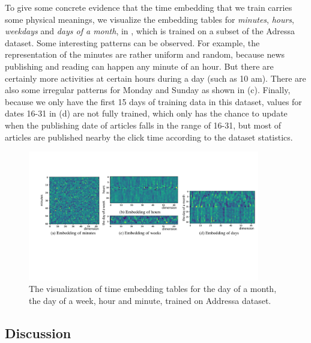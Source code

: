 To give some concrete evidence that the time embedding that we train
carries some physical meanings, we visualize the embedding tables for
\textit{minutes}, \textit{hours}, \textit{weekdays} and \textit{days
of a month}, in , which is trained on a subset of the Adressa dataset.
Some interesting patterns can be observed. For example, the representation
of the minutes are rather uniform and random, because news publishing and
reading can happen any minute of an hour. But there are certainly more
activities at certain hours during a day (such as 10 am). There are also
some irregular patterns for Monday and Sunday as shown in (c).
Finally, because we only have the first 15 days of training data in this dataset,
values for dates 16-31 in (d) are not fully trained, which only has the chance to update when the publishing date of articles falls in the range of 16-31, but most of articles are published nearby the click time according to the dataset statistics.
\begin{figure}[th]
  \centering
  \includegraphics[width=0.9\textwidth]{fig/visualization.pdf}  
  \caption{The visualization of time embedding tables for the day of a month, the day of a week, hour and minute, trained on Addressa dataset.}
  \label{fig:temporal}
\end{figure}


\subsection{Discussion}
\label{sec:discuss}

